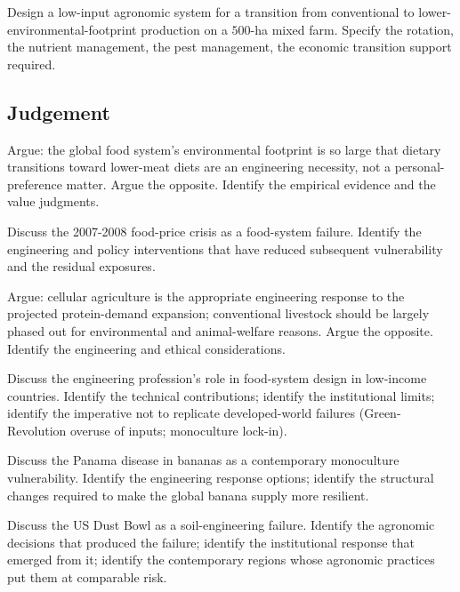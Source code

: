 \begin{exercise}
Design a low-input agronomic system for a transition from conventional to lower-environmental-footprint production on a $500$-ha mixed farm. Specify the rotation, the nutrient management, the pest management, the economic transition support required.
\end{exercise}

\subsection*{Judgement}

\begin{exercise}
Argue: the global food system's environmental footprint is so large that dietary transitions toward lower-meat diets are an engineering necessity, not a personal-preference matter. Argue the opposite. Identify the empirical evidence and the value judgments.
\end{exercise}

\begin{exercise}
Discuss the 2007-2008 food-price crisis as a food-system failure. Identify the engineering and policy interventions that have reduced subsequent vulnerability and the residual exposures.
\end{exercise}

\begin{exercise}
Argue: cellular agriculture is the appropriate engineering response to the projected protein-demand expansion; conventional livestock should be largely phased out for environmental and animal-welfare reasons. Argue the opposite. Identify the engineering and ethical considerations.
\end{exercise}

\begin{exercise}
Discuss the engineering profession's role in food-system design in low-income countries. Identify the technical contributions; identify the institutional limits; identify the imperative not to replicate developed-world failures (Green-Revolution overuse of inputs; monoculture lock-in).
\end{exercise}

\begin{exercise}
Discuss the Panama disease in bananas as a contemporary monoculture vulnerability. Identify the engineering response options; identify the structural changes required to make the global banana supply more resilient.
\end{exercise}

\begin{exercise}
Discuss the US Dust Bowl as a soil-engineering failure. Identify the agronomic decisions that produced the failure; identify the institutional response that emerged from it; identify the contemporary regions whose agronomic practices put them at comparable risk.
\end{exercise}

